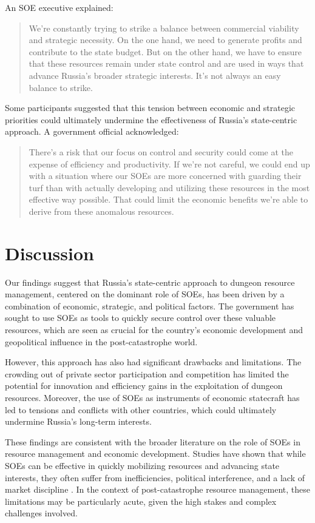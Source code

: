 \documentclass[12pt, a4paper]{article}
\begin{document}
An SOE executive explained:

\begin{quote}
We're constantly trying to strike a balance between commercial viability and strategic necessity. On the one hand, we need to generate profits and contribute to the state budget. But on the other hand, we have to ensure that these resources remain under state control and are used in ways that advance Russia's broader strategic interests. It's not always an easy balance to strike.
\end{quote}

Some participants suggested that this tension between economic and strategic priorities could ultimately undermine the effectiveness of Russia's state-centric approach. A government official acknowledged:

\begin{quote}
There's a risk that our focus on control and security could come at the expense of efficiency and productivity. If we're not careful, we could end up with a situation where our SOEs are more concerned with guarding their turf than with actually developing and utilizing these resources in the most effective way possible. That could limit the economic benefits we're able to derive from these anomalous resources.
\end{quote}

\section{Discussion}
Our findings suggest that Russia's state-centric approach to dungeon resource management, centered on the dominant role of SOEs, has been driven by a combination of economic, strategic, and political factors. The government has sought to use SOEs as tools to quickly secure control over these valuable resources, which are seen as crucial for the country's economic development and geopolitical influence in the post-catastrophe world.

However, this approach has also had significant drawbacks and limitations. The crowding out of private sector participation and competition has limited the potential for innovation and efficiency gains in the exploitation of dungeon resources. Moreover, the use of SOEs as instruments of economic statecraft has led to tensions and conflicts with other countries, which could ultimately undermine Russia's long-term interests.

These findings are consistent with the broader literature on the role of SOEs in resource management and economic development. Studies have shown that while SOEs can be effective in quickly mobilizing resources and advancing state interests, they often suffer from inefficiencies, political interference, and a lack of market discipline \citep{Megginson2001, Cuervo-Cazurra2014}. In the context of post-catastrophe resource management, these limitations may be particularly acute, given the high stakes and complex challenges involved.
\end{document}
